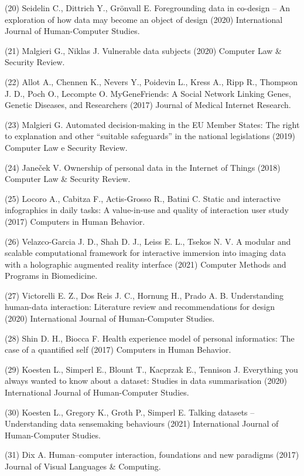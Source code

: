 \documentclass[
	12pt,				%
	oneside,			%
	a4paper,			%
	english,			%
	brazil				%
	]{abntex2ppgsi}
\begin{document}
\begin{apendicesenv}
(20) Seidelin C., Dittrich Y., Grönvall E. Foregrounding data in co-design – An exploration of how data may become an object of design (2020) International Journal of Human-Computer Studies.

(21) Malgieri G., Niklas J. Vulnerable data subjects (2020) Computer Law \& Security Review.

(22) Allot A., Chennen K., Nevers Y., Poidevin L., Kress A., Ripp R., Thompson J. D., Poch O., Lecompte O. MyGeneFriends: A Social Network Linking Genes, Genetic Diseases, and Researchers (2017) Journal of Medical Internet Research.

(23) Malgieri G. Automated decision-making in the EU Member States: The right to explanation and other “suitable safeguards” in the national legislations (2019) Computer Law e Security Review.

(24) Janeček V. Ownership of personal data in the Internet of Things (2018) Computer Law \& Security Review.

(25) Locoro A., Cabitza F., Actis-Grosso R., Batini C. Static and interactive infographics in daily tasks: A value-in-use and quality of interaction user study (2017) Computers in Human Behavior.

(26) Velazco-Garcia J. D., Shah D. J., Leiss E. L., Tsekos N. V. A modular and scalable computational framework for interactive immersion into imaging data with a holographic augmented reality interface (2021) Computer Methods and Programs in Biomedicine.

(27) Victorelli E. Z., Dos Reis J. C., Hornung H., Prado A. B. Understanding human-data interaction: Literature review and recommendations for design (2020) International Journal of Human-Computer Studies.

(28) Shin D. H., Biocca F. Health experience model of personal informatics: The case of a quantified self (2017) Computers in Human Behavior.

(29) Koesten L., Simperl E., Blount T., Kacprzak E., Tennison J. Everything you always wanted to know about a dataset: Studies in data summarisation (2020) International Journal of Human-Computer Studies.

(30) Koesten L., Gregory K., Groth P., Simperl E. Talking datasets – Understanding data sensemaking behaviours (2021) International Journal of Human-Computer Studies.

(31) Dix A. Human–computer interaction, foundations and new paradigms (2017) Journal of Visual Languages \& Computing.


\end{apendicesenv}
\end{document}
